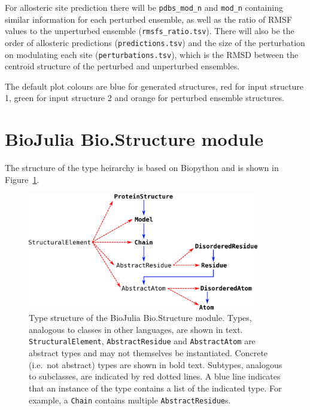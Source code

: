 For allosteric site prediction there will be \verb|pdbs_mod_n| and \verb|mod_n| containing similar information for each perturbed ensemble, as well as the ratio of RMSF values to the unperturbed ensemble (\verb|rmsfs_ratio.tsv|). There will also be the order of allosteric predictions (\verb|predictions.tsv|) and the size of the perturbation on modulating each site (\verb|perturbations.tsv|), which is the RMSD between the centroid structure of the perturbed and unperturbed ensembles.

The default plot colours are blue for generated structures, red for input structure 1, green for input structure 2 and orange for perturbed ensemble structures.


\section{BioJulia Bio.Structure module}

The structure of the type heirarchy is based on Biopython \cite{Cock2009} and is shown in Figure~\ref{fig:model_structure}.


\begin{figure}
\centering

\includegraphics[width=0.9\textwidth]{figures/model_structure/model_structure}

\caption{Type structure of the BioJulia Bio.Structure module.
Types, analogous to classes in other languages, are shown in text.
\texttt{StructuralElement}, \texttt{AbstractResidue} and \texttt{AbstractAtom} are abstract types and may not themselves be instantiated.
Concrete (i.e.\ not abstract) types are shown in bold text.
Subtypes, analogous to subclasses, are indicated by red dotted lines.
A blue line indicates that an instance of the type contains a list of the indicated type.
For example, a \texttt{Chain} contains multiple \texttt{AbstractResidue}s.}

\label{fig:model_structure}
\end{figure}
